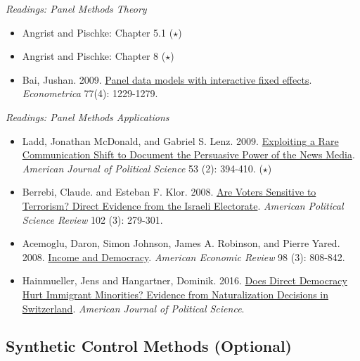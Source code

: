 \documentclass{article}
\begin{document}
\emph{Readings: Panel Methods Theory}
\begin{itemize}
\item  Angrist and Pischke: Chapter 5.1 ($\star$)
\item  Angrist and Pischke: Chapter 8 ($\star$)
\item Bai, Jushan. 2009. \href{http://www.jstor.org/stable/40263859}{Panel data models with interactive fixed effects}. \textit{Econometrica} 77(4): 1229-1279.
\end{itemize}

\emph{Readings: Panel Methods Applications}
\begin{itemize}
\item Ladd, Jonathan McDonald, and Gabriel S. Lenz. 2009.  \href{http://onlinelibrary.wiley.com/doi/10.1111/j.1540-5907.2009.00377.x/abstract} {Exploiting a Rare Communication Shift to Document the Persuasive Power of the News Media}. \textit{American Journal of Political Science} 53 (2): 394-410. ($\star$)
\item Berrebi, Claude. and Esteban F. Klor. 2008.  \href{http://journals.cambridge.org/abstract_S0003055408080246} {Are Voters Sensitive to Terrorism? Direct Evidence from the Israeli Electorate}. \textit{American Political Science Review} 102 (3): 279-301.
\item Acemoglu, Daron, Simon Johnson, James A. Robinson, and Pierre Yared. 2008. \href{http://www.nber.org/papers/w11205}{Income and Democracy}. \textit{American Economic Review} 98 (3): 808-842.
\item Hainmueller, Jens and Hangartner, Dominik. 2016. \href{http://papers.ssrn.com/sol3/papers.cfm?abstract_id=2022064}{Does Direct Democracy Hurt Immigrant Minorities? Evidence from Naturalization Decisions in Switzerland}. \textit{American Journal of Political Science}.

\end{itemize}

\subsection{Synthetic Control Methods (Optional)}
\end{document}

